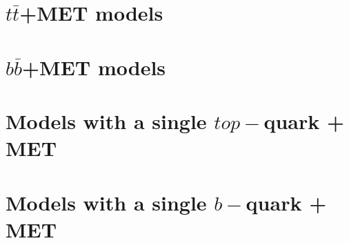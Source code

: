 \section{\texorpdfstring{$t \bar{t}$+MET models}{ttbar+MET models}}



 \section{\texorpdfstring{$b \bar{b}$+MET models}{bbbar+MET models}}
 
 

\section{\texorpdfstring{Models with a single $top-$quark + MET}{Models with a single top-quark + MET}}


 
 \section{\texorpdfstring{Models with a single $b-$quark + MET}{Models with a single b-quark + MET}}
 
 

